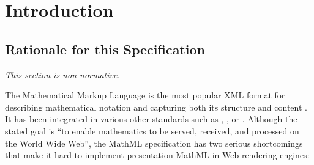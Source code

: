 \section{Introduction}

\subsection{Rationale for this Specification}

{\em This section is non-normative.}

The Mathematical Markup Language is the most popular XML format for describing
mathematical notation and capturing both its structure and content
\cite{MathML3}. It has been integrated in various other standards such as
\cite{HTML5}, \cite{EPUB3}, \cite{ODF1} or \cite{Daisy3}. Although
the stated goal is ``to enable mathematics to be served, received, and
processed on the World Wide Web'', the MathML specification has
two serious shortcomings that make it hard to implement presentation MathML in
Web rendering engines:


